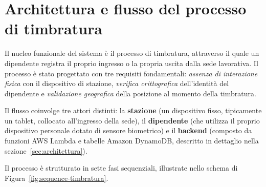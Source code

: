 
\section{Architettura e flusso del processo di timbratura}
\label{sec:flusso-timbratura}

Il nucleo funzionale del sistema è il processo di timbratura, attraverso
il quale un dipendente registra il proprio ingresso o la propria uscita
dalla sede lavorativa. Il processo è stato progettato con tre requisiti
fondamentali: \emph{assenza di interazione fisica} con il dispositivo di
stazione, \emph{verifica crittografica} dell'identità del dipendente e
\emph{validazione geografica} della posizione al momento della timbratura.

Il flusso coinvolge tre attori distinti: la \textbf{stazione} (un
dispositivo fisso, tipicamente un tablet, collocato all'ingresso della
sede), il \textbf{dipendente} (che utilizza il proprio dispositivo
personale dotato di sensore biometrico) e il \textbf{backend} (composto
da funzioni AWS Lambda e tabelle Amazon DynamoDB, descritto in dettaglio
nella sezione~\ref{sec:architettura}).

Il processo è strutturato in sette fasi sequenziali, illustrate nello
schema di Figura~\ref{fig:sequence-timbratura}.

